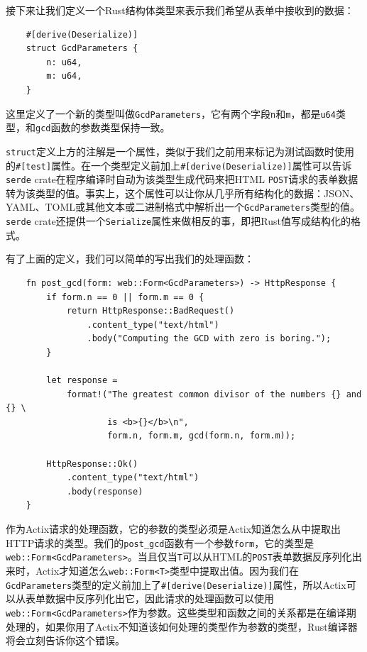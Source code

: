接下来让我们定义一个Rust结构体类型来表示我们希望从表单中接收到的数据：
\begin{verbatim}
    #[derive(Deserialize)]
    struct GcdParameters {
        n: u64,
        m: u64,
    }
\end{verbatim}

这里定义了一个新的类型叫做\texttt{GcdParameters}，它有两个字段\texttt{n}和\texttt{m}，都是\texttt{u64}类型，和\texttt{gcd}函数的参数类型保持一致。

\texttt{struct}定义上方的注解是一个属性，类似于我们之前用来标记为测试函数时使用的\texttt{\#[test]}属性。在一个类型定义前加上\texttt{\#[derive(Deserialize)]}属性可以告诉\texttt{serde} crate在程序编译时自动为该类型生成代码来把HTML \texttt{POST}请求的表单数据转为该类型的值。事实上，这个属性可以让你从几乎所有结构化的数据：JSON、YAML、TOML或其他文本或二进制格式中解析出一个\texttt{GcdParameters}类型的值。\texttt{serde} crate还提供一个\texttt{Serialize}属性来做相反的事，即把Rust值写成结构化的格式。

有了上面的定义，我们可以简单的写出我们的处理函数：
\begin{verbatim}
    fn post_gcd(form: web::Form<GcdParameters>) -> HttpResponse {
        if form.n == 0 || form.m == 0 {
            return HttpResponse::BadRequest()
                .content_type("text/html")
                .body("Computing the GCD with zero is boring.");
        }

        let response = 
            format!("The greatest common divisor of the numbers {} and {} \
                    is <b>{}</b>\n",
                    form.n, form.m, gcd(form.n, form.m));
        
        HttpResponse::Ok()
            .content_type("text/html")
            .body(response)
    }
\end{verbatim}

作为Actix请求的处理函数，它的参数的类型必须是Actix知道怎么从中提取出HTTP请求的类型。我们的\texttt{post\_gcd}函数有一个参数\texttt{form}，它的类型是\texttt{web::Form<GcdParameters>}。当且仅当\texttt{T}可以从HTML的\texttt{POST}表单数据反序列化出来时，Actix才知道怎么\texttt{web::Form<T>}类型中提取出值。因为我们在\texttt{GcdParameters}类型的定义前加上了\texttt{\#[derive(Deserialize)]}属性，所以Actix可以从表单数据中反序列化出它，因此请求的处理函数可以使用\\
\texttt{web::Form<GcdParameters>}作为参数。这些类型和函数之间的关系都是在编译期处理的，如果你用了Actix不知道该如何处理的类型作为参数的类型，Rust编译器将会立刻告诉你这个错误。

